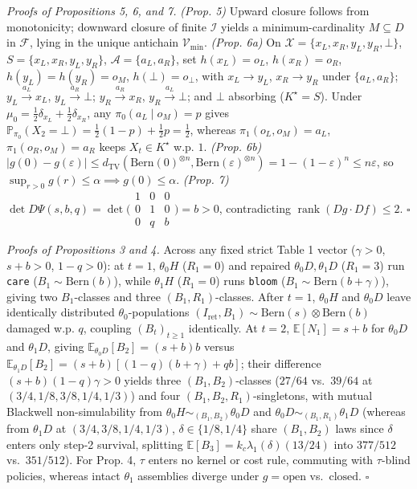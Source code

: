 \documentclass[11pt,letterpaper]{article}
\begin{document}
\emph{Proofs of Propositions 5, 6, and 7.} \emph{(Prop. 5)} Upward
closure follows from monotonicity; downward closure of finite
\(\mathcal{I}\) yields a minimum-cardinality \(M \subseteq D\) in
\(\mathcal{F}\), lying in the unique antichain \(\mathcal{V}_{\min}\).
\emph{(Prop. 6a)} On \(\mathcal{X} = \{x_L, x_R, y_L, y_R, \bot\}\),
\(S = \{x_L, x_R, y_L, y_R\}\), \(\mathcal{A} = \{a_L, a_R\}\), set
\(h(x_L)=o_L\), \(h(x_R)=o_R\), \(h(y_L)=h(y_R)=o_M\),
\(h(\bot)=o_\bot\), with \(x_L \to y_L\), \(x_R \to y_R\) under
\(\{a_L,a_R\}\); \(y_L \xrightarrow{a_L} x_L\),
\(y_L \xrightarrow{a_R} \bot\); \(y_R \xrightarrow{a_R} x_R\),
\(y_R \xrightarrow{a_L} \bot\); and \(\bot\) absorbing
(\(K^\star = S\)). Under
\(\mu_0 = \frac{1}{2}\delta_{x_L} + \frac{1}{2}\delta_{x_R}\), any
\(\pi_0(a_L \mid o_M) = p\) gives
\(\mathbb{P}_{\pi_0}(X_2 = \bot) = \frac{1}{2}(1-p) + \frac{1}{2}p = \frac{1}{2}\),
whereas \(\pi_1(o_L,o_M)=a_L\), \(\pi_1(o_R,o_M)=a_R\) keeps
\(X_t \in K^\star\) w.p. \(1\). \emph{(Prop. 6b)}
\(|g(0) - g(\varepsilon)| \le d_{\mathrm{TV}}(\mathrm{Bern}(0)^{\otimes n}, \mathrm{Bern}(\varepsilon)^{\otimes n}) = 1 - (1-\varepsilon)^n \le n\varepsilon\),
so \(\sup_{r>0} g(r) \le \alpha \implies g(0) \le \alpha\). \emph{(Prop.
7)}
\(\det D\Psi(s,b,q) = \det \bigl(\begin{smallmatrix}1&0&0\\0&1&0\\0&q&b\end{smallmatrix}\bigr) = b > 0\),
contradicting \(\operatorname{rank}(Dg \cdot Df) \le 2\). \(\square\)

\emph{Proofs of Propositions 3 and 4.} Across any fixed strict Table 1
vector (\(\gamma > 0\), \(s+b > 0\), \(1-q > 0\)): at \(t=1\),
\(\theta_0 H\) (\(R_1=0\)) and repaired \(\theta_0 D, \theta_1 D\)
(\(R_1=3\)) run \texttt{care} (\(B_1 \sim \mathrm{Bern}(b)\)), while
\(\theta_1 H\) (\(R_1=0\)) runs \texttt{bloom}
(\(B_1 \sim \mathrm{Bern}(b+\gamma)\)), giving two \(B_1\)-classes and
three \((B_1,R_1)\)-classes. After \(t=1\), \(\theta_0 H\) and
\(\theta_0 D\) leave identically distributed \(\theta_0\)-populations
\((I_{\mathrm{ret}}, B_1) \sim \mathrm{Bern}(s)\otimes\mathrm{Bern}(b)\)
damaged w.p. \(q\), coupling \((B_t)_{t\ge 1}\) identically. At \(t=2\),
\(\mathbb{E}[N_1] = s+b\) for \(\theta_0 D\) and \(\theta_1 D\), giving
\(\mathbb{E}_{\theta_0 D}[B_2] = (s+b)b\) versus
\(\mathbb{E}_{\theta_1 D}[B_2] = (s+b)[(1-q)(b+\gamma)+qb]\); their
difference \((s+b)(1-q)\gamma > 0\) yields three \((B_1,B_2)\)-classes
(\(27/64\) vs.~\(39/64\) at \((3/4,1/8,3/8,1/4,1/3)\)) and four
\((B_1,B_2,R_1)\)-singletons, with mutual Blackwell non-simulability
from \(\theta_0 H \sim_{(B_1,B_2)} \theta_0 D\) and
\(\theta_0 D \sim_{(B_1,R_1)} \theta_1 D\) (whereas from \(\theta_1 D\)
at \((3/4,3/8,1/4,1/3)\), \(\delta \in \{1/8,1/4\}\) share \((B_1,B_2)\)
laws since \(\delta\) enters only step-2 survival, splitting
\(\mathbb{E}[B_3] = k_c\lambda_1(\delta)(13/24)\) into \(377/512\)
vs.~\(351/512\)). For Prop. 4, \(\tau\) enters no kernel or cost rule,
commuting with \(\tau\)-blind policies, whereas intact \(\theta_1\)
assemblies diverge under \(g=\mathrm{open}\) vs.~\(\mathrm{closed}\).
\(\square\)
\end{document}
